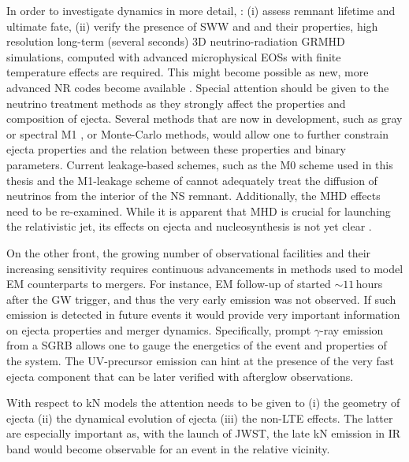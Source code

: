 In order to investigate \pmerg{} dynamics in more detail, \eg: 
(i) assess remnant lifetime and ultimate fate, 
(ii) verify the presence of \ac{SWW} and \nwind{} and their properties, 
high resolution long-term (several seconds) $3$D neutrino-radiation \ac{GRMHD} 
simulations, computed with advanced microphysical \acp{EOS} with finite temperature effects are required.
This might become possible as new, more advanced \ac{NR} codes become available 
\citep[\eg][]{Daszuta:2021ecf}.
Special attention should be given to the neutrino treatment methods as they strongly affect the 
properties and composition of ejecta.
Several methods that are now in development, such as gray or spectral M1 \citep{Foucart:2016rxm,Roberts:2016lzn},
or Monte-Carlo methods, would allow one to further constrain ejecta 
properties and the relation between these properties and binary parameters.
%
Current leakage-based schemes, such as 
the M0 scheme used in this thesis and the M1-leakage scheme of \citet{Sekiguchi:2015dma,Fujibayashi:2017puw}
cannot adequately treat the diffusion of neutrinos from the interior of the
\pmerg{} \ac{NS} remnant.
Additionally, the \ac{MHD} effects need to be re-examined. While it is 
apparent that \ac{MHD} is crucial for launching the relativistic jet, its effects on 
ejecta and nucleosynthesis is not yet clear \citep{Siegel:2017jug, Fernandez:2018kax}.

On the other front, the growing number of observational facilities and their increasing 
sensitivity requires continuous advancements in methods used to 
model \ac{EM} counterparts to mergers.
%
For instance, \ac{EM} follow-up of \GW{} started ${\sim}11\,$hours after the 
\ac{GW} trigger, and thus the very early emission was not observed. 
If such emission is detected in future events it would provide very important information on ejecta properties and merger dynamics.
%
Specifically, prompt $\gamma$-ray emission from a \ac{SGRB} allows one to 
gauge the energetics of the event and properties of the system.
The \ac{UV}-precursor emission can hint at the presence of the very 
fast ejecta component that can be later verified with afterglow observations. 


With respect to \ac{kN} models the attention needs to be given to 
(i) the geometry of ejecta 
(ii) the dynamical evolution of ejecta 
(iii) the non-\ac{LTE} effects.
%
The latter are especially important as, with the launch of \ac{JWST}, 
the late \ac{kN} emission in \ac{IR} band would become observable for an event in the 
relative vicinity.


